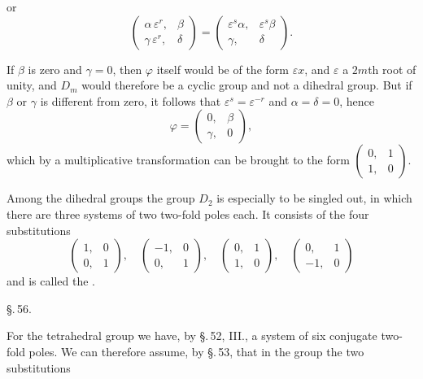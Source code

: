 or
\[
\begin{pmatrix} \alpha\,\varepsilon^r, & \beta \\ \gamma\,\varepsilon^r, & \delta \end{pmatrix} = \begin{pmatrix} \varepsilon^s\alpha, & \varepsilon^s\beta \\ \gamma, & \delta \end{pmatrix}.
\]

If $\beta$ is zero and $\gamma = 0$, then $\varphi$ itself would be of the form $\varepsilon x$,
and $\varepsilon$ a $2m$th root of unity, and $D_m$ would therefore be a cyclic
group and not a dihedral group. But if $\beta$ or $\gamma$ is different
from zero, it follows that $\varepsilon^s = \varepsilon^{-r}$ and $\alpha = \delta = 0$, hence
\[
\varphi = \begin{pmatrix} 0, & \beta \\ \gamma, & 0 \end{pmatrix},
\]
which by a multiplicative transformation can be brought to the form
$\begin{pmatrix} 0, & 1 \\ 1, & 0 \end{pmatrix}$.

Among the dihedral groups the group $D_2$ is especially
to be singled out, in which there are three systems of two two-fold
poles each. It consists of the four substitutions
\[
\begin{pmatrix} 1, & 0 \\ 0, & 1 \end{pmatrix},\quad
\begin{pmatrix} -1, & 0 \\ 0, & 1 \end{pmatrix},\quad
\begin{pmatrix} 0, & 1 \\ 1, & 0 \end{pmatrix},\quad
\begin{pmatrix} 0, & 1 \\ -1, & 0 \end{pmatrix}
\]
and is called the .

\begin{center}
\S.\,56. \\[6pt]
\end{center}

For the tetrahedral group we have, by \S.\,52, III., a
system of six conjugate two-fold poles. We can
therefore assume, by \S.\,53, that in the group the two substitutions

